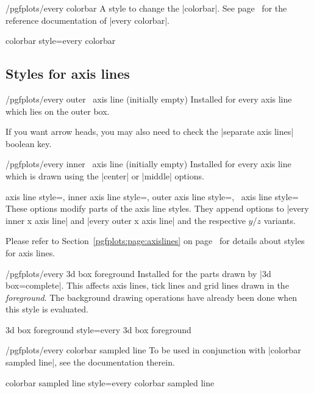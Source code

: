 \begin{stylekey}{/pgfplots/every colorbar}
	A style to change the |colorbar|. See page~\pageref{key:every:colorbar} for the reference documentation of |every colorbar|.
\end{stylekey}

\pgfplotsshortstylekey colorbar style=every colorbar\pgfeov

\subsection*{Styles for axis lines}
\begin{xystylekey}{/pgfplots/every outer \x\ axis line (initially empty)}
	Installed for every axis line which lies on the outer box.

	If you want arrow heads, you may also need to check the |separate axis lines| boolean key.
\end{xystylekey}

\begin{xystylekey}{/pgfplots/every inner \x\ axis line (initially empty)}
	Installed for every axis line which is drawn using the |center| or |middle| options.
\end{xystylekey}

\begin{pgfplotsxykeylist}{%
	axis line style=,
	inner axis line style=,
	outer axis line style=,
	\x\ axis line style=}
	These options modify parts of the axis line styles. They append options to |every inner x axis line| and |every outer x axis line| and the respective $y$/$z$ variants.
\end{pgfplotsxykeylist}

\noindent
Please refer to Section~\ref{pgfplots:page:axislines} on page~\pageref{pgfplots:page:axislines} for details about styles for axis lines.

\begin{stylekey}{/pgfplots/every 3d box foreground}
	Installed for the parts drawn by |3d box=complete|. This affects axis lines, tick lines and grid lines drawn in the \emph{foreground}. The background drawing operations have already been done when this style is evaluated.
\end{stylekey}

\pgfplotsshortstylekey 3d box foreground style=every 3d box foreground\pgfeov

\begin{stylekey}{/pgfplots/every colorbar sampled line}
	To be used in conjunction with |colorbar sampled line|, see the documentation therein.
\end{stylekey}
\pgfplotsshortstylekey colorbar sampled line style=every colorbar sampled line\pgfeov

